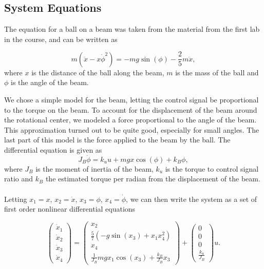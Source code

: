 \subsection{System Equations}


The equation for a ball on a beam was taken from the material from the first lab in the course, and can be written as

\begin{equation}
m(\ddot{x}-x\dot{\phi}^{2})=-mg\sin(\phi)-\frac{2}{5}m\ddot{x},
\end{equation}
where $x$ is the distance of the ball along the beam, $m$ is the mass of the ball and $\phi$ is the angle of the beam.

We chose a simple model for the beam, letting the control signal be proportional to the torque on the beam.
To account for the displacement of the beam around the rotational center, we modeled a force proportional to the angle of the beam.
This approximation turned out to be quite good, especially for small angles.
The last part of this model is the force applied to the beam by the ball.
The differential equation is given as
\begin{equation}
J_{B}\ddot{\phi}=k_{u}u+mgx\cos(\phi)+k_B\phi,
\end{equation}
where $J_{B}$ is the moment of inertia of the beam, $k_u$ is the torque to control signal ratio and $k_B$ the estimated torque per radian from the displacement of the beam.\\
\\
Letting $x_{1}=x,\, x_{2}=\dot{x},\, x_{3}=\phi,\, x_{4}=\dot{\phi}$,
we can then write the system as a set of first order nonlinear differential equations

%
%
%
%

\[
\begin{pmatrix}\dot{x}_{1}\\
\dot{x}_{2}\\
\dot{x}_{3}\\
\dot{x}_{4}
\end{pmatrix}=\begin{pmatrix}x_{2}\\
\frac{5}{7}\left(-g\sin(x_{3})+x_{1}x_{4}^{2}\right)\\
x_{4}\\
\frac{1}{J_B}mgx_{1}\cos(x_3)+\frac{k_B}{J_B}x_3
\end{pmatrix}+\begin{pmatrix}0\\
0\\
0\\
\frac{k_{u}}{J_B}
\end{pmatrix}u.
\]

